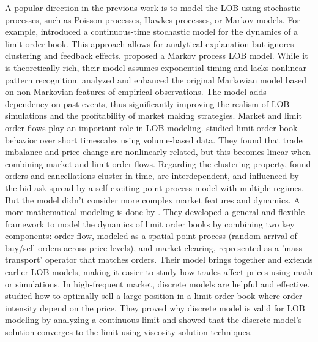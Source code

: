 A popular direction in the previous work is to model the LOB using stochastic processes, such as Poisson processes, Hawkes processes, or Markov models. For example, \cite{cont_stochastic_2010} introduced a continuous-time stochastic model for the dynamics of a limit order book. This approach allows for analytical explanation but ignores clustering and feedback effects. 
\cite{bleher_orders_2021} proposed a Markov process LOB model. While it is theoretically rich, their model assumes exponential timing and lacks nonlinear pattern recognition.
\cite{lu_order-book_2018} analyzed and enhanced the original Markovian model based on non-Markovian features of empirical observations. The model adds dependency on past events, thus significantly improving the realism of LOB simulations and the profitability of market making strategies. 
Market and limit order flows play an important role in LOB modeling. \cite{bechler2017orderflowslimitorder} studied limit order book behavior over short timescales using volume-based data. They found that trade imbalance and price change are nonlinearly related, but this becomes linear when combining market and limit order flows. 
Regarding the clustering property, \cite{vinkovskaya_point_nodate} found orders and cancellations cluster in time, are interdependent, and influenced by the bid-ask spread by a self-exciting point process model with multiple regimes. But the model didn't consider more complex market features and dynamics.
A more mathematical modeling is done by \cite{cont_mathematical_2023}. They developed a general and flexible framework to model the dynamics of limit order books by combining two key components: order flow, modeled as a spatial point process (random arrival of buy/sell orders across price levels), and market clearing, represented as a 'mass transport' operator that matches orders. Their model brings together and extends earlier LOB models, making it easier to study how trades affect prices using math or simulations.
In high-frequent market, discrete models are helpful and effective. \cite{bayraktar_liquidation_2012} studied how to optimally sell a large position in a limit order book where order intensity depend on the price. They proved why discrete model is valid for LOB modeling by analyzing a continuous limit and showed that the discrete model's solution converges to the limit using viscosity solution techniques. 


